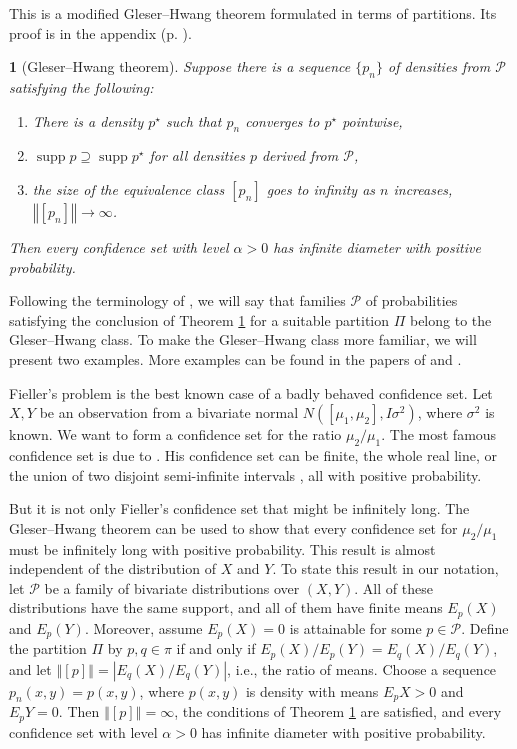 \documentclass[article]{ajs}
\numberwithin{equation}{section}
\numberwithin{figure}{section}
\theoremstyle{plain}
\newtheorem{thm}{\protect\theoremname}
\theoremstyle{definition}
\theoremstyle{definition}
\theoremstyle{plain}
\providecommand{\theoremname}{Theorem}
\DeclareMathOperator{\supp}{supp}
\begin{document}
This is a modified Gleser--Hwang theorem \citep[Theorem 1]{gleser1987nonexistence}
formulated in terms of partitions. Its proof is in the appendix (p.
\pageref{proof:Gleser--Hwang}).
\begin{thm}[Gleser--Hwang theorem]
\label{thm:Gleser--Hwang} Suppose there is a sequence $\{p_{n}\}$
of densities from $\mathcal{P}$ satisfying the following: 
\begin{enumerate}
\item There is a density $p^{\star}$ such that $p_{n}$ converges to $p^{\star}$
pointwise,
\item $\supp p\supseteq\supp p^{\star}$ for all densities $p$ derived
from $\mathcal{P}$,
\item the size of the equivalence class $[p_{n}]$ goes to infinity as $n$
increases, $\left\Vert [p_{n}]\right\Vert \to\infty$.
\end{enumerate}
Then every confidence set with level $\alpha>0$ has infinite diameter
with positive probability.
\end{thm}

Following the terminology of \citet{berger1999integrated}, we will
say that families $\mathcal{P}$ of probabilities satisfying the conclusion
of Theorem \ref{thm:Gleser--Hwang} for a suitable partition $\Pi$
belong to the Gleser--Hwang class. To make the Gleser--Hwang class
more familiar, we will present two examples. More examples can be
found in the papers of \citet{gleser1987nonexistence} and \citet{berger1999integrated}.

Fieller's problem is the best known case of a badly behaved confidence
set. Let $X,Y$ be an observation from a bivariate normal $N([\mu_{1},\mu_{2}],I\sigma^{2})$,
where $\sigma^{2}$ is known. We want to form a confidence set for
the ratio $\mu_{2}/\mu_{1}$. The most famous confidence set is due
to \citet{Fieller1940-lg}. His confidence set can be finite, the
whole real line, or the union of two disjoint semi-infinite intervals
\citep{Koschat1987-dk}, all with positive probability.

But it is not only Fieller's confidence set that might be infinitely
long. The Gleser--Hwang theorem can be used to show that every confidence
set for $\mu_{2}/\mu_{1}$ must be infinitely long with positive probability.
This result is almost independent of the distribution of $X$ and
$Y$. To state this result in our notation, let $\mathcal{P}$ be
a family of bivariate distributions over $(X,Y)$. All of these distributions
have the same support, and all of them have finite means $E_{p}(X)$
and $E_{p}(Y)$. Moreover, assume $E_{p}(X)=0$ is attainable for
some $p\in\mathcal{P}$. Define the partition $\Pi$ by $p,q\in\pi$
if and only if $E_{p}(X)/E_{p}(Y)=E_{q}(X)/E_{q}(Y)$, and let $\left\Vert [p]\right\Vert =|E_{q}(X)/E_{q}(Y)|$,
i.e., the ratio of means. Choose a sequence $p_{n}(x,y)=p(x,y)$,
where $p(x,y)$ is density with means $E_{p}X>0$ and $E_{p}Y=0$.
Then $\left\Vert [p]\right\Vert =\infty$, the conditions of Theorem
\ref{thm:Gleser--Hwang} are satisfied, and every confidence set with
level $\alpha>0$ has infinite diameter with positive probability.
\end{document}
